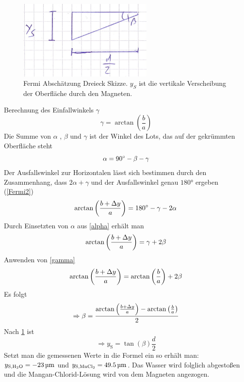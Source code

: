 \documentclass[
	a4paper,
	12pt,
	pagesize,
	ngerman
]{scrartcl}
\begin{document}
	\begin{figure}[htb]
	  \centering
	    \includegraphics[width=0.6\textwidth]{Fermi3} 
		\caption[Fermi Abschätzung Dreieck Skizze.]{Fermi Abschätzung Dreieck Skizze. $y_S$ ist die vertikale Verscheibung der Oberfläche durch den Magneten.}
		\label{Fermi3}
	\end{figure}
	
	\noindent{}Berechnung des Einfallwinkels $\gamma$
	\begin{equation}
		\gamma = \arctan \left(\frac{b}{a}\right) 
		\label{gamma}
	\end{equation}
	Die Summe von $\alpha$ , $\beta$ und $\gamma$ ist der Winkel des Lots, das auf der gekrümmten Oberfläche steht
	\begin{equation}
		\alpha = \ang{90} - \beta - \gamma \\
		\label{alpha}
	\end{equation}
	Der Ausfallswinkel zur Horizontalen lässt sich bestimmen durch den Zusammenhang, dass $2\alpha + \gamma$ und der Ausfallswinkel genau $\ang{180}$ ergeben (\cref{Fermi2})
	\begin{equation}
		\arctan \left(\frac{b+\Delta y}{a}\right) = \ang{180} - \gamma - 2\alpha \\
	\end{equation}
	Durch Einsetzten von $\alpha$ aus \cref{alpha} erhält man
	\begin{equation}
		\arctan \left(\frac{b+\Delta y}{a}\right) = \gamma + 2 \beta \\
	\end{equation}
	Anwenden von \cref{gamma}
	\begin{equation}
		\arctan \left(\frac{b+\Delta y}{a}\right) =   \arctan \left(\frac{b}{a}\right) + 2 \beta \\
	\end{equation}
	Es folgt
	\begin{equation}
		\Rightarrow \beta = \frac{\arctan \left(\frac{b+\Delta y}{a}\right) -  \arctan \left(\frac{b}{a}\right)}{2} \\
	\end{equation}
	Nach \cref{Fermi3} ist
	\begin{equation}
		\Rightarrow y_\text{S} = \tan (\beta) \frac{d}{2}  
	\end{equation}
	Setzt man die gemessenen Werte in die Formel ein so erhält man: $ y_{\text{S,\ce{H2O}}} = \SI{-23}{\micro \meter} $ und $y_{\text{S,\ce{MnCl2}}} = \SI{49,5}{ \micro \meter} $. Das Wasser wird folglich abgestoßen und die Mangan-Chlorid-Lösung wird von dem Magneten angezogen.
	
\end{document}
